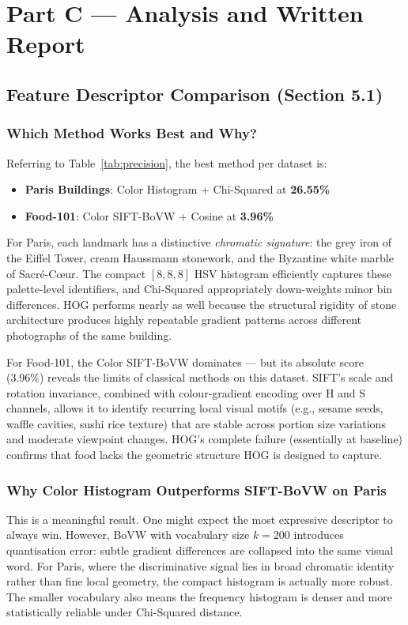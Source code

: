 \documentclass[11pt, a4paper]{article}
\begin{document}
\newpage
\section{Part C — Analysis and Written Report}

\subsection{Feature Descriptor Comparison (Section 5.1)}

\subsubsection{Which Method Works Best and Why?}
Referring to Table~\ref{tab:precision}, the best method per dataset is:
\begin{itemize}
  \item \textbf{Paris Buildings}: Color Histogram + Chi-Squared at \textbf{26.55\%}
  \item \textbf{Food-101}: Color SIFT-BoVW + Cosine at \textbf{3.96\%}
\end{itemize}

For Paris, each landmark has a distinctive \textit{chromatic signature}: the grey iron of the Eiffel Tower, cream Haussmann stonework, and the Byzantine white marble of Sacré-Cœur. The compact $[8,8,8]$ HSV histogram efficiently captures these palette-level identifiers, and Chi-Squared appropriately down-weights minor bin differences. HOG performs nearly as well because the structural rigidity of stone architecture produces highly repeatable gradient patterns across different photographs of the same building.

For Food-101, the Color SIFT-BoVW dominates — but its absolute score (3.96\%) reveals the limits of classical methods on this dataset. SIFT's scale and rotation invariance, combined with colour-gradient encoding over H and S channels, allows it to identify recurring local visual motifs (e.g., sesame seeds, waffle cavities, sushi rice texture) that are stable across portion size variations and moderate viewpoint changes. HOG's complete failure (essentially at baseline) confirms that food lacks the geometric structure HOG is designed to capture.

\subsubsection{Why Color Histogram Outperforms SIFT-BoVW on Paris}
This is a meaningful result. One might expect the most expressive descriptor to always win. However, BoVW with vocabulary size $k=200$ introduces quantisation error: subtle gradient differences are collapsed into the same visual word. For Paris, where the discriminative signal lies in broad chromatic identity rather than fine local geometry, the compact histogram is actually more robust. The smaller vocabulary also means the frequency histogram is denser and more statistically reliable under Chi-Squared distance.
\end{document}

